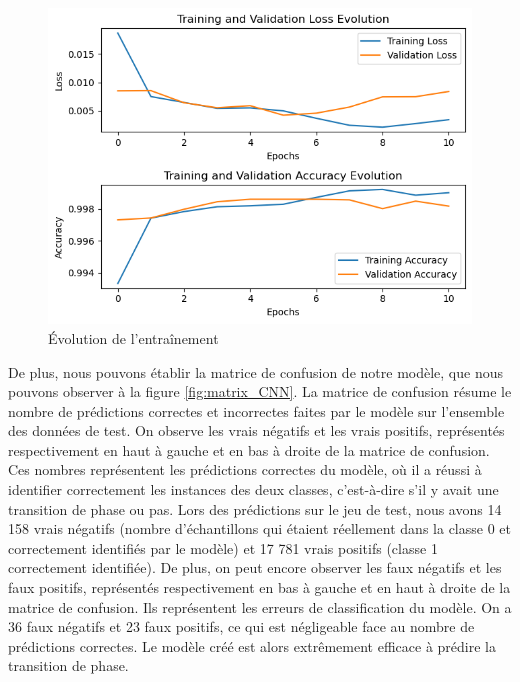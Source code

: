 \documentclass[11pt, parskip=half]{scrartcl} %
\begin{document}
\begin{figure}[h]
	\centering
	\includegraphics[width=0.66\linewidth]{./figures/train.png}
	\caption{Évolution de l'entraînement}
	\label{fig:train}
\end{figure}

De plus, nous pouvons établir la matrice de confusion de notre modèle, que nous pouvons observer à la figure \ref{fig:matrix_CNN}. La matrice de confusion résume le nombre de prédictions correctes et incorrectes faites par le modèle sur l’ensemble des données de test. On observe les vrais négatifs et les vrais positifs, représentés respectivement en haut à gauche et en bas à droite de la matrice de confusion. Ces nombres représentent les prédictions correctes du modèle, où il a réussi à identifier correctement les instances des deux classes,  c’est-à-dire s’il y avait une transition de phase ou pas. Lors des prédictions sur le jeu de test, nous avons 14 158 vrais négatifs (nombre d’échantillons qui étaient réellement dans la classe 0 et correctement identifiés par le modèle) et 17 781 vrais positifs (classe 1 correctement identifiée). De plus, on peut encore observer les faux négatifs et les faux positifs, représentés respectivement en bas à gauche et en haut à droite de la matrice de confusion. Ils représentent les erreurs de classification du modèle. On a 36 faux négatifs et 23 faux positifs, ce qui est négligeable face au nombre de prédictions correctes. Le modèle créé est alors extrêmement efficace à prédire la transition de phase.
\end{document}
